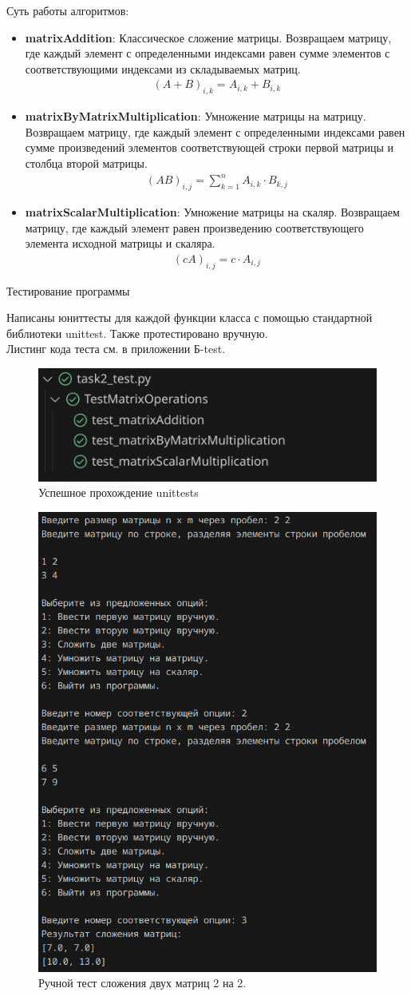 Суть работы алгоритмов:
\begin{itemize}
	\item \textbf{matrixAddition}: Классическое сложение матрицы. Возвращаем матрицу, где каждый элемент с определенными индексами равен сумме элементов с соответствующими индексами из складываемых матриц.
	\begin{gather*}
		(A+B)_{i,k} = A_{i,k} + B_{i,k}
	\end{gather*}
	
	\item \textbf{matrixByMatrixMultiplication}: Умножение матрицы на матрицу. Возвращаем матрицу, где каждый элемент с определенными индексами равен сумме произведений элементов соответствующей строки первой матрицы и столбца второй матрицы.
	\begin{gather*}
		(AB)_{i,j} = \sum_{k=1}^{n} A_{i,k} \cdot B_{k,j}
	\end{gather*}
	
	\item \textbf{matrixScalarMultiplication}: Умножение матрицы на скаляр. Возвращаем матрицу, где каждый элемент равен произведению соответствующего элемента исходной матрицы и скаляра.
	\begin{gather*}
		(cA)_{i,j} = c \cdot A_{i,j}
	\end{gather*}
\end{itemize}
\begin{large}
	Тестирование программы\\
\end{large}
Написаны юниттесты для каждой функции класса с помощью стандартной библиотеки unittest. Также протестировано вручную.\\
Листинг кода теста см. в приложении Б-test.\\
\begin{figure}[H]
	\centering
	\includegraphics[width=0.5\linewidth]{tests-task4}
	\caption*{Успешное прохождение unittests}
	\label{fig:tests-task4}
\end{figure}
\begin{figure}[H]
	\centering
	\includegraphics[width=0.46\linewidth]{tests-task5}
	\caption*{Ручной тест сложения двух матриц 2 на 2.}
	\label{fig:tests-task5}
\end{figure}
